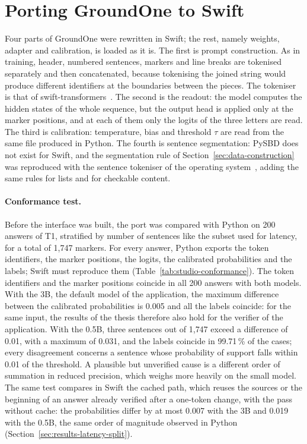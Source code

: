 \section{Porting GroundOne to Swift}
\label{sec:studio-port}

Four parts of GroundOne were rewritten in Swift; the rest, namely weights, adapter and calibration, is loaded as it is.
The first is prompt construction. As in training, header, numbered sentences, markers and line breaks are tokenised
separately and then concatenated, because tokenising the joined string would produce different identifiers at the
boundaries between the pieces. The tokeniser is that of swift-transformers~\cite{hf2026swifttransformers}. The second is
the readout: the model computes the hidden states of the whole sequence, but the output head is applied only at the
marker positions, and at each of them only the logits of the three letters are read. The third is calibration:
temperature, bias and threshold $\tau$ are read from the same file produced in Python. The fourth is sentence
segmentation: PySBD does not exist for Swift, and the segmentation rule of Section~\ref{sec:data-construction} was
reproduced with the sentence tokeniser of the operating system~\cite{apple2026nltokenizer}, adding the same rules for
lists and for checkable content.

\paragraph{Conformance test.} Before the interface was built, the port was compared with Python on 200 answers of T1,
stratified by number of sentences like the subset used for latency, for a total of 1{,}747 markers. For every answer,
Python exports the token identifiers, the marker positions, the logits, the calibrated probabilities and the labels;
Swift must reproduce them (Table~\ref{tab:studio-conformance}). The token identifiers and the marker positions coincide
in all 200 answers with both models. With the 3B, the default model of the application, the maximum difference between
the calibrated probabilities is 0.005 and all the labels coincide: for the same input, the results of the thesis
therefore also hold for the verifier of the application. With the 0.5B, three sentences out of 1{,}747 exceed a
difference of 0.01, with a maximum of 0.031, and the labels coincide in 99.71\,\% of the cases; every disagreement
concerns a sentence whose probability of support falls within 0.01 of the threshold. A plausible but unverified cause is
a different order of summation in reduced precision, which weighs more heavily on the small model. The same test compares in Swift the cached path, which reuses the sources or the beginning of an answer already verified after a one-token change, with the pass without cache: the probabilities differ by at most 0.007 with the 3B and 0.019 with the 0.5B, the same order of magnitude observed in Python (Section~\ref{sec:results-latency-split}).

